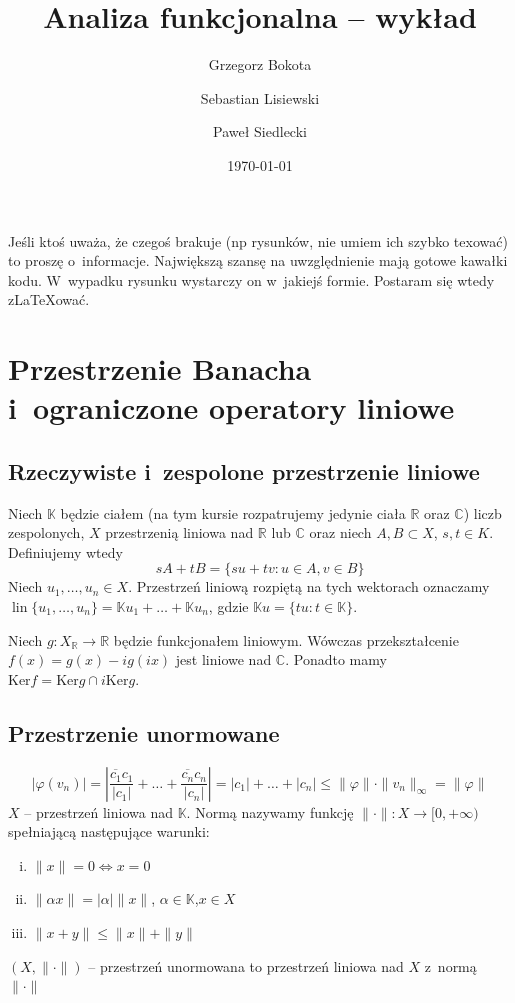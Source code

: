 \documentclass[11pt]{mwrep}
\title{Analiza funkcjonalna  -- wykład}
\author{Grzegorz Bokota \and \normalsize  Sebastian Lisiewski \and \normalsize Paweł Siedlecki}
\date{\today}
\renewcommand{\[}{\begin{equation}}
\renewcommand{\]}{\end{equation}}
\newcommand{\C}{{\ensuremath{\mathbb C}}}
\newcommand{\R}{{\ensuremath{\mathbb R}}}
\newcommand{\K}{\ensuremath{\mathbb{K}}}
\newcommand{\lin}{\operatorname{lin}}
\newcounter{numer}
\begin{document}
\setlength{\headheight}{15pt}
\pagestyle{fancy}
\maketitle
\tableofcontents
{}
Jeśli ktoś uważa, że czegoś brakuje (np rysunków, nie umiem ich szybko texować) to proszę o~informacje. 
Największą szansę na uwzględnienie mają gotowe kawałki kodu. W~wypadku rysunku wystarczy on w~jakiejś formie. Postaram się wtedy z\LaTeX ować.
\chapter{Przestrzenie Banacha i~ograniczone operatory liniowe}
\section{Rzeczywiste i~zespolone przestrzenie liniowe}
Niech $\K$ będzie ciałem (na tym kursie rozpatrujemy jedynie ciała $\R$ oraz $\C$) liczb zespolonych,
$X$ przestrzenią liniowa nad $\R$ lub $\C$ oraz niech $A,B \subset  X$, $s,t \in K$. Definiujemy wtedy
$$sA+tB = \{su + tv\colon u \in A, v\in B\}$$
Niech $u_1,\ldots ,u_n \in X $. Przestrzeń liniową rozpiętą na tych wektorach oznaczamy $\lin\{u_1,\ldots, u_n\} = \K u_1 + \ldots + \K u_n $, gdzie $\K u = \{ t u\colon t \in \K\}$. 

Niech $g: X_\R \to \R $ będzie funkcjonałem liniowym. Wówczas przekształcenie $f(x) =g(x) - ig(ix)$ jest liniowe nad $\C$. Ponadto mamy $\textrm{Ker}f = \textrm{Ker} g \cap i \textrm{Ker}g$.

\section{Przestrzenie unormowane}
$$|\varphi(v_n)| = \left| \frac{\overline{c_1} c_1}{|c_1|}+\ldots+\frac{\overline{c_n} c_n}{|c_n|} \right|= |c_1| +\ldots + |c_n| \le \|\varphi\|\cdot \|v_n\|_\infty = \|\varphi\|$$
$X$ -- przestrzeń liniowa nad $\K$. Normą nazywamy funkcję  $\|\cdot \|\colon X \to [0, +\infty )$ spełniającą następujące warunki:
	\begin{enumerate}[i.]
	\item $\|x\| = 0 \Leftrightarrow x=0$ 
	\item $\|\alpha x \| = |\alpha| \| x\|$, $\alpha \in \K$,$x\in X$ 
	\item $\|x+y\| \le \|x\| + \|y\|$  
\end{enumerate}
$(X,\|\cdot\|)$ -- przestrzeń unormowana to przestrzeń liniowa nad $X$ z~normą $\|\cdot\|$\\
\end{document}
